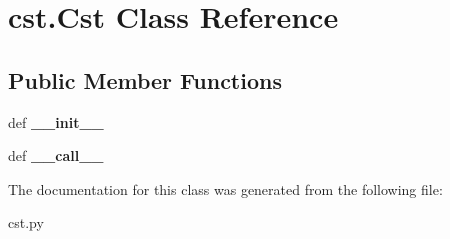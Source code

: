 \hypertarget{classcst_1_1Cst}{\section{cst.\-Cst \-Class \-Reference}
\label{classcst_1_1Cst}
}
\subsection*{\-Public \-Member \-Functions}
\begin{DoxyCompactItemize}
\item 
\hypertarget{classcst_1_1Cst_aa2b939a4963ef6e945b4162881e9e921}{def {\bfseries \-\_\-\-\_\-init\-\_\-\-\_\-}}\label{classcst_1_1Cst_aa2b939a4963ef6e945b4162881e9e921}

\item 
\hypertarget{classcst_1_1Cst_ad90496107430d6d6b517b31269398898}{def {\bfseries \-\_\-\-\_\-call\-\_\-\-\_\-}}\label{classcst_1_1Cst_ad90496107430d6d6b517b31269398898}

\end{DoxyCompactItemize}


\-The documentation for this class was generated from the following file\-:\begin{DoxyCompactItemize}
\item 
cst.\-py\end{DoxyCompactItemize}
